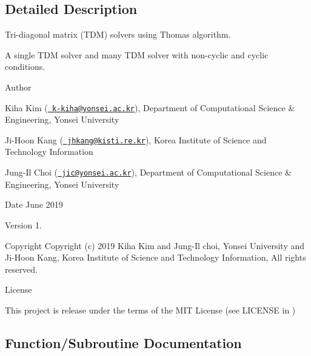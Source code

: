 \subsection{Detailed Description}
Tri-\/diagonal matrix (T\+DM) solvers using Thomas algorithm. 

A single T\+DM solver and many T\+DM solver with non-\/cyclic and cyclic conditions. \begin{DoxyAuthor}{Author}

\end{DoxyAuthor}

\begin{DoxyItemize}
\item Kiha Kim (\href{mailto:k-kiha@yonsei.ac.kr}{\texttt{ k-\/kiha@yonsei.\+ac.\+kr}}), Department of Computational Science \& Engineering, Yonsei University
\item Ji-\/\+Hoon Kang (\href{mailto:jhkang@kisti.re.kr}{\texttt{ jhkang@kisti.\+re.\+kr}}), Korea Institute of Science and Technology Information
\item Jung-\/\+Il Choi (\href{mailto:jic@yonsei.ac.kr}{\texttt{ jic@yonsei.\+ac.\+kr}}), Department of Computational Science \& Engineering, Yonsei University
\end{DoxyItemize}

\begin{DoxyDate}{Date}
June 2019 
\end{DoxyDate}
\begin{DoxyVersion}{Version}
1. 
\end{DoxyVersion}
\begin{DoxyParagraph}{Copyright}
Copyright (c) 2019 Kiha Kim and Jung-\/\+Il choi, Yonsei University and Ji-\/\+Hoon Kang, Korea Institute of Science and Technology Information, All rights reserved. 
\end{DoxyParagraph}
\begin{DoxyParagraph}{License }

\end{DoxyParagraph}
This project is release under the terms of the M\+IT License (see L\+I\+C\+E\+N\+SE in ) 

\subsection{Function/\+Subroutine Documentation}
\mbox{\label{tdmas_8f90_a6c50d548eaa4b5e9b96ccbf8f65cb12a}} 
